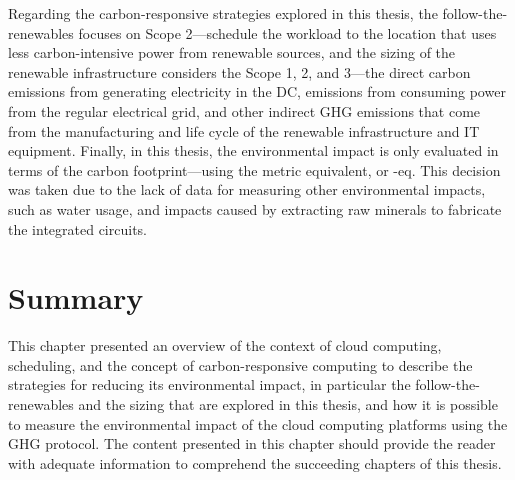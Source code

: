 Regarding the carbon-responsive strategies explored in this thesis, the follow-the-renewables focuses on Scope 2---schedule the workload to the location that uses less carbon-intensive power from renewable sources, and the sizing of the renewable infrastructure considers the  Scope 1, 2, and 3---the direct carbon emissions from generating electricity in the DC, emissions from consuming power from the regular electrical grid, and other indirect GHG emissions that come from the manufacturing and life cycle of the renewable infrastructure and IT equipment. Finally, in this thesis, the environmental impact is only evaluated in terms of the carbon footprint---using the metric  equivalent, or -eq. This decision was taken due to the lack of data for measuring other environmental impacts, such as water usage, and impacts caused by extracting raw minerals to fabricate the integrated circuits.

\section{Summary}

This chapter presented an overview of the context of cloud computing, scheduling, and the concept of carbon-responsive computing to describe the strategies for reducing its environmental impact, in particular the follow-the-renewables and the sizing that are explored in this thesis, and how it is possible to measure the environmental impact of the cloud computing platforms using the GHG protocol. The content presented in this chapter should provide the reader with adequate information to comprehend the succeeding chapters of this thesis.
